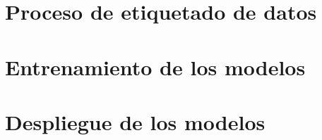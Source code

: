 

\section{Proceso de etiquetado de datos}
\label{sec:etiquetado}



\section{Entrenamiento de los modelos}
\label{sec:entrenamiento}



\section{Despliegue de los modelos}
\label{sec:despliegue_modelos}

